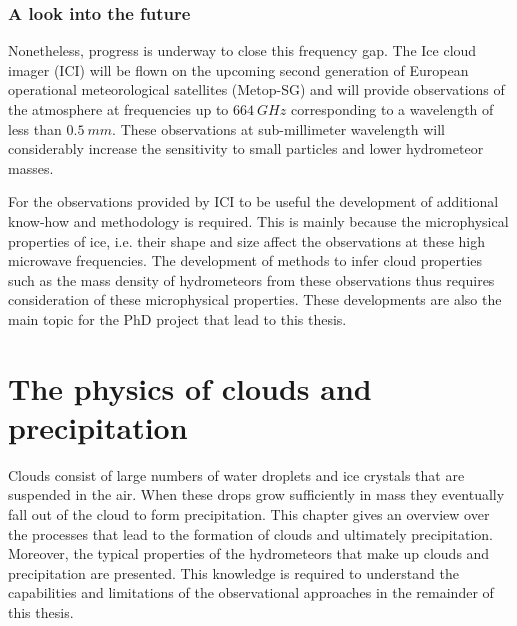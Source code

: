 \subsection{A look into the future}

Nonetheless, progress is underway to close this frequency gap. The Ice cloud
imager (ICI) will be flown on the upcoming second generation of European operational
meteorological satellites (Metop-SG) and will provide observations of the atmosphere
at frequencies up to $664\ \unit{GHz}$ corresponding to a wavelength of less than
$0.5\ \unit{mm}$. These observations at sub-millimeter wavelength will considerably
increase the sensitivity to small particles and lower hydrometeor masses.

For the observations provided by ICI to be useful the development of additional
know-how and methodology is required. This is mainly because the microphysical
properties of ice, i.e. their shape and size affect the observations at these
high microwave frequencies. The development of methods to infer cloud properties
such as the mass density of hydrometeors from these observations thus requires
consideration of these microphysical properties. These developments are also the main
topic for the PhD project that lead to this thesis.

%
%
%
\chapter{The physics of clouds and precipitation}
\label{ch:clouds}

Clouds consist of large numbers of water droplets and ice crystals that are
suspended in the air. When these drops grow sufficiently in mass they
eventually fall out of the cloud to form precipitation. This chapter gives an
overview over the processes that lead to the formation of clouds and ultimately
precipitation. Moreover, the typical properties of the hydrometeors that make up
clouds and precipitation are presented. This knowledge is required to understand
the capabilities and limitations of the observational approaches in the remainder
of this thesis.

